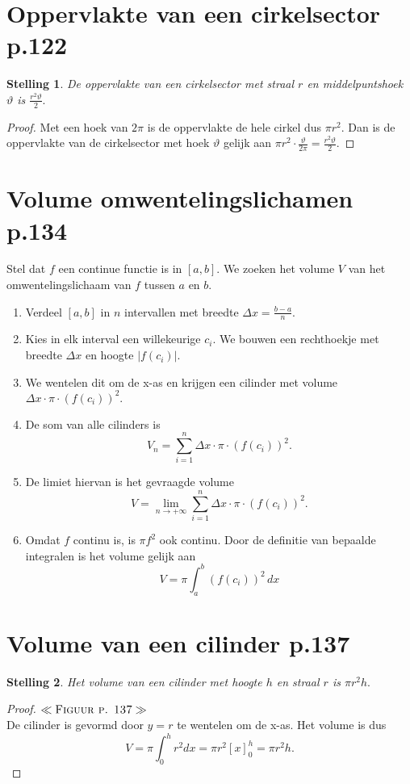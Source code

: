 \documentclass{article}
\newtheorem*{Stelling}{Stelling}
\begin{document}
\section{Oppervlakte van een cirkelsector p.122}
\begin{Stelling}
    De oppervlakte van een cirkelsector met straal $r$ en middelpuntshoek $\vartheta$ is $\frac{r^2\vartheta}{2}.$
\end{Stelling}
\begin{proof}
    Met een hoek van $2\pi$ is de oppervlakte de hele cirkel dus $\pi r^2$. Dan is de oppervlakte van de cirkelsector met hoek $\vartheta$ gelijk aan $\pi r^2\cdot\frac{\vartheta}{2\pi} = \frac{r^2\vartheta}{2}.$
\end{proof}
\section{Volume omwentelingslichamen p.134}
Stel dat $f$ een continue functie is in $\left[a,b\right]$. We zoeken het volume $V$ van het omwentelingslichaam van $f$ tussen $a$ en $b$.
\begin{enumerate}
    \item Verdeel $\left[a,b\right]$ in $n$ intervallen met breedte $\Delta x = \frac{b-a}{n}.$
    \item Kies in elk interval een willekeurige $c_i$. We bouwen een rechthoekje met breedte $\Delta x$ en hoogte $\left|f\left(c_i\right)\right|$.
    \item We wentelen dit om de x-as en krijgen een cilinder met volume\\ $\Delta x \cdot \pi \cdot\left(f\left(c_i\right)\right)^2.$
    \item De som van alle cilinders is $$V_n = \sum_{i=1}^n\Delta x \cdot \pi \cdot\left(f\left(c_i\right)\right)^2.$$
    \item De limiet hiervan is het gevraagde volume $$V = \lim_{n\to +\infty} \sum_{i=1}^n\Delta x \cdot \pi \cdot\left(f\left(c_i\right)\right)^2.$$
    \item Omdat $f$ continu is, is $\pi f^2$ ook continu. Door de definitie van bepaalde integralen is het volume gelijk aan $$V=\pi\int_a^b\left(f\left(c_i\right)\right)^2\, dx$$
\end{enumerate}
\section{Volume van een cilinder p.137}
\begin{Stelling}
    Het volume van een cilinder met hoogte $h$ en straal $r$ is $\pi r^2h.$
\end{Stelling}
\begin{proof}
   $\ll\textsc{Figuur p. 137}\gg$\\ De cilinder is gevormd door $y=r$ te wentelen om de x-as. Het volume is dus $$V = \pi\int_0^h r^2 dx= \pi r^2 \left[x\right]_0^h = \pi r^2h.$$
\end{proof}
\end{document}

